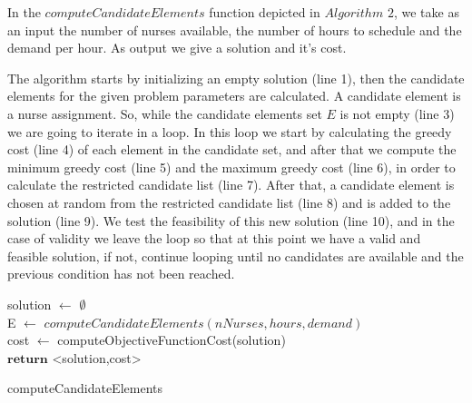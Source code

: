 In the $computeCandidateElements$ function depicted in $Algorithm$ $2$, we take as an input the number of nurses available, the number of hours to schedule and the demand per hour. As output we give a solution and it's cost.

The algorithm starts by initializing an empty solution (line 1), then the candidate elements for the given problem parameters are calculated. A candidate element is a nurse assignment. So, while the candidate elements set $E$ is not empty (line 3) we are going to iterate in a loop. In this loop we start by calculating the greedy cost (line 4) of each element in the candidate set, and after that we compute the minimum greedy cost (line 5) and the maximum greedy cost (line 6), in order to calculate the restricted candidate list (line 7). After that, a candidate element is chosen at random from the restricted candidate list (line 8) and is added to the solution (line 9). We test the feasibility of this new solution (line 10), and in the case of validity we leave the loop so that at this point we have a valid and feasible solution, if not, continue looping until no candidates are available and the previous condition has not been reached.

\begin{algorithm}[H]


solution $\leftarrow$ $\emptyset$ \\
E $\leftarrow$ $computeCandidateElements(nNurses, hours, demand)$ \\
cost $\leftarrow$ computeObjectiveFunctionCost(solution)\\
$\textbf{return}$ <solution,cost>
\caption{computeCandidateElements}\label{alg.mainLoop}
\end{algorithm}


